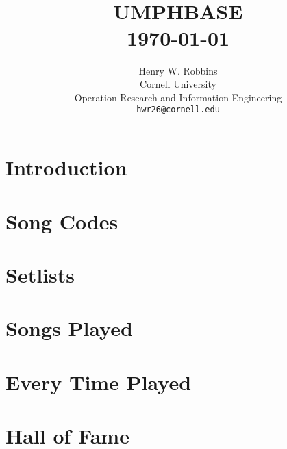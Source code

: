 \documentclass[8pt]{book}
\title{	\normalsize \textsc{} 					%
        \\[2.0cm]								
        \HRule{2pt} \\ [0.5cm]		
	\Huge \textbf{\uppercase{UMPHBASE}}	%
	\HRule{2pt} \\ [0.5cm]
	\large \today						%
}
\author{
	Henry W. Robbins\\	
	Cornell University\\	
	Operation Research and Information Engineering\\
        \texttt{hwr26@cornell.edu} \\
}
\makeatletter
\let\mcnewpage=\newpage
\newcommand{\TrickSupertabularIntoMulticols}{
\renewcommand\newpage{
    \if@firstcolumn
        \hrule width\linewidth height0pt
            \columnbreak
        \else
          \mcnewpage
        \fi
}}
\def\printtitle{%
    {\centering \@title\par}}
\def\printauthor{					
    {\centering \large \@author}}
\makeatother
\begin{document}
\thispagestyle{empty}		
\printtitle					
\vfill
\printauthor				
\newpage

\tableofcontents
\newpage

\chapter{Introduction}

\chapter{Song Codes}

\begin{multicols*}{4}
\TrickSupertabularIntoMulticols
\begin{footnotesize}

\end{footnotesize}
\end{multicols*}


\chapter{Setlists}



\chapter{Songs Played}


\newpage
\setlength{\tabcolsep}{3.5pt}


\chapter{Every Time Played}

\begin{multicols*}{4}
\TrickSupertabularIntoMulticols
\begin{footnotesize}

\end{footnotesize}
\end{multicols*}

\chapter{Hall of Fame}

\begin{multicols*}{3}
\TrickSupertabularIntoMulticols

\end{multicols*}
\end{document}
